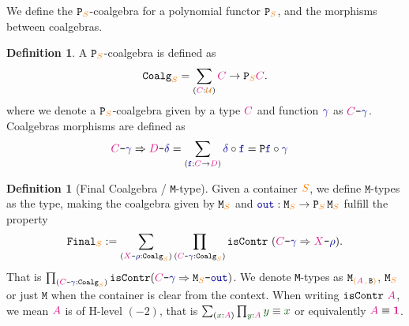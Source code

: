 \documentclass[twoside,11pt,openright]{report}
\theoremstyle{plain} %
\theoremstyle{definition}
\newtheorem{defn}[thm]{Definition}%
\theoremstyle{remark}
\newcommand*{\term}[1]{\textcolor{green!30!black}{#1}} %
\newcommand*{\type}[1]{\textcolor{magenta!90!black}{#1}}
\newcommand*{\container}[1]{\textcolor{orange}{#1}}
\newcommand*{\containerpair}[2]{\ensuremath{\colorlet{savedleftcolor}{.}\color{orange}\left(\color{savedleftcolor}#1\,\textcolor{orange}{\mathbf{,}}\,#2\color{orange}\right)\color{savedleftcolor}}}
\newcommand*{\universe}[1]{\textcolor{orange!80!black}{#1}}
\newcommand*{\unit}{\type{\textbf{1}}}
\newcommand*{\coalg}[2]{#1\texttt{-}#2}
\newcommand*{\function}[1]{\textcolor{blue!60!black}{\ensuremath{\mathtt{#1}}}}
\newcommand*{\typeformer}[1]{\ensuremath{\mathtt{#1}}}
\newcommand*{\functor}[1]{\ensuremath{\mathbf{\mathtt{#1}}}}
\begin{document}
\noindent We define the \(\functor{P}_{\container{S}}\)-coalgebra for a polynomial functor \(\functor{P}_{\container{S}}\), and the morphisms between coalgebras.
\begin{defn}
  A \(\functor{P}_{\container{S}}\)-coalgebra is defined as
  \begin{equation}
    \typeformer{Coalg}_{\container{S}} = \sum_{(\type{C} : \universe{\mathcal{U}})} \type{C} \rightarrow \functor{P}_{\container{S}}\type{C}.
  \end{equation}
  where we denote a \(\functor{P}_{\container{S}}\)-coalgebra given by a type \(\type{C}\) and function \(\function{\gamma}\) as \(\coalg{\type{C}}{\function{\gamma}}\). Coalgebras morphisms are defined as
  \begin{equation}
    \begin{aligned}
      \coalg{\type{C}}{\function{\gamma}} \Rightarrow \coalg{\type{D}}{\function{\delta}} &= \sum_{(\function{f} : \type{C} \rightarrow \type{D})} \function{\delta} \circ \function{f} = \functor{P} \function{f} \circ \function{\gamma}
    \end{aligned}
  \end{equation}
\end{defn}
\begin{defn}[Final Coalgebra / \texttt{M}-type]
  \label{defn:M-type-final-def}
  Given a container \(\container{S}\), we define \(\mathtt{M}\)-types as the type, making the coalgebra given by \(\typeformer{M}_{\container{S}}\) and \(\function{out} : \typeformer{M}_{\container{S}} \rightarrow \functor{P}_{\container{S}}\,\typeformer{M}_{\container{S}}\) fulfill the property
  \begin{equation}
    \typeformer{Final}_{\container{S}} := \sum_{(\coalg{\type{X}}{\function{\rho}} : \mathtt{Coalg}_{\container{S}})} \prod_{(\coalg{\type{C}}{\function{\gamma}} : \mathtt{Coalg}_{\container{S}})} \mathtt{isContr}~(\coalg{\type{C}}{\function{\gamma}} \Rightarrow \coalg{\type{X}}{\function{\rho}}).
  \end{equation}
  That is \(\prod_{(\coalg{\type{C}}{\function{\gamma}} : \mathtt{Coalg}_{\container{S}})} \mathtt{isContr}(\coalg{\type{C}}{\function{\gamma}} \Rightarrow \coalg{\typeformer{M}_{\container{S}}}{\function{out}})\). We denote \texttt{M}-types as \(\typeformer{M}_{\containerpair{\type{A}}{\typeformer{B}}}\), \(\typeformer{M}_{\container{S}}\) or just \(\typeformer{M}\) when the container is clear from the context. When writing \(\mathtt{isContr}~\type{A}\), we mean \(\type{A}\) is of H-level \((-2)\), that is \(\sum_{(\term{x} : \type{A})} \prod_{\term{y} : \type{A}} \term{y} \equiv \term{x}\) or equivalently \(\type{A} \equiv \unit\).
\end{defn}
\end{document}
